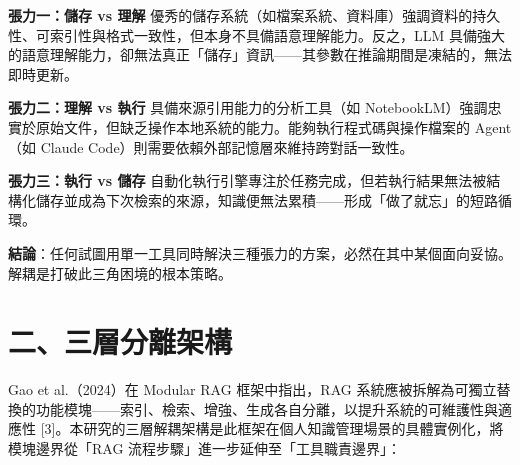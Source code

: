 \textbf{張力一：儲存 vs 理解}
優秀的儲存系統（如檔案系統、資料庫）強調資料的持久性、可索引性與格式一致性，但本身不具備語意理解能力。反之，LLM
具備強大的語意理解能力，卻無法真正「儲存」資訊------其參數在推論期間是凍結的，無法即時更新。

\textbf{張力二：理解 vs 執行} 具備來源引用能力的分析工具（如
NotebookLM）強調忠實於原始文件，但缺乏操作本地系統的能力。能夠執行程式碼與操作檔案的
Agent（如 Claude Code）則需要依賴外部記憶層來維持跨對話一致性。

\textbf{張力三：執行 vs 儲存}
自動化執行引擎專注於任務完成，但若執行結果無法被結構化儲存並成為下次檢索的來源，知識便無法累積------形成「做了就忘」的短路循環。

\textbf{結論}：任何試圖用單一工具同時解決三種張力的方案，必然在其中某個面向妥協。解耦是打破此三角困境的根本策略。

\section{二、三層分離架構}\label{ux4e8cux4e09ux5c64ux5206ux96e2ux67b6ux69cb}

Gao et al.（2024）在 Modular RAG 框架中指出，RAG
系統應被拆解為可獨立替換的功能模塊------索引、檢索、增強、生成各自分離，以提升系統的可維護性與適應性
{[}3{]}。本研究的三層解耦架構是此框架在個人知識管理場景的具體實例化，將模塊邊界從「RAG
流程步驟」進一步延伸至「工具職責邊界」：

